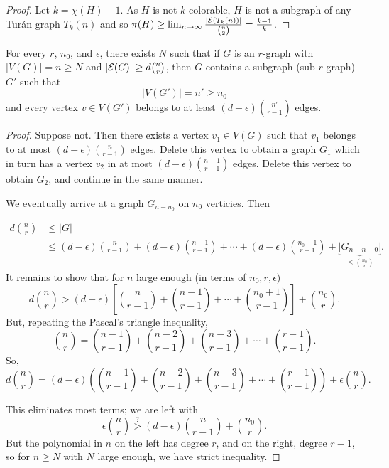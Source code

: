 \begin{proof}	
Let $k = \chi(H)-1$. As $H$ is not $k$-colorable, $H$ is not a subgraph of any Tur\'an graph $T_k(n)$ and so $\pi(H)\geq \lim_{n\to\infty} \frac{|\mathcal{E} (T_k(n))|}{{n\choose 2}} = \frac{k-1}{k}$.
\end{proof}

\begin{lemma} \label{lem:subgraph_with_min_vertex_degree}
For every $r$, $n_0$, and $\epsilon$, there exists $N$ such that if $G$ is an $r$-graph with $|V(G)| = n\geq N$ and $|\mathcal{E} (G)|\geq d {n\choose r}$, then $G$ contains a subgraph (sub $r$-graph) $G'$ such that
\[
|V(G')| =n' \geq n_0
\]
and every vertex $v\in V(G')$ belongs to at least $(d - \epsilon) {n' \choose r-1}$ edges.
\end{lemma}
\begin{proof}	
Suppose not. Then there exists a vertex $v_1\in V(G)$ such that $v_1$ belongs to at most $(d - \epsilon) {n \choose r-1}$ edges. Delete this vertex to obtain a graph $G_1$ which in turn has a vertex $v_2$ in at most $(d- \epsilon){n-1 \choose r-1}$ edges. Delete this vertex to obtain $G_2$, and continue in the same manner.

We eventually arrive at a graph $G_{n-n_0}$ on $n_0$ verticies. Then
\begin{fullwidth}
\begin{align*}	
d {n \choose r} &\leq |G| \\
&\leq (d -\epsilon){n\choose r-1} + (d- \epsilon) {n-1 \choose r-1} + \dotsm + (d- \epsilon){n_0+1 \choose r-1} + \underbrace{|G_{n-n-0}|}_{\leq {n_0\choose r}}.
\end{align*}
It remains to show that for $n$ large enough (in terms of $n_0,r,\epsilon$)
\[
d {n \choose r} > (d- \epsilon) \left[{n\choose r-1} +  {n-1 \choose r-1} + \dotsm + {n_0+1 \choose r-1}  \right] + {n_0 \choose r}.
\]
But, repeating the Pascal's triangle inequality,
\[
{n\choose r} = {n-1 \choose r-1} + {n-2\choose r-1} + {n-3 \choose r-1} + \dotsm + {r-1 \choose r-1}.
\]
So,
\[
d {n\choose r} = (d - \epsilon) \left( {n-1 \choose r-1} + {n-2\choose r-1} + {n-3 \choose r-1} + \dotsm + {r-1 \choose r-1} \right) + \epsilon {n\choose r}.
\]
\end{fullwidth}

This eliminates most terms; we are left with
\[
\epsilon {n\choose r} \overset{?}{>} (d- \epsilon) {n\choose r-1} + {n_0 \choose r}.
\]
But the polynomial in $n$ on the left has degree $r$, and on the right, degree $r-1$, so for $n\geq N$ with $N$ large enough, we have strict inequality.

\end{proof}

